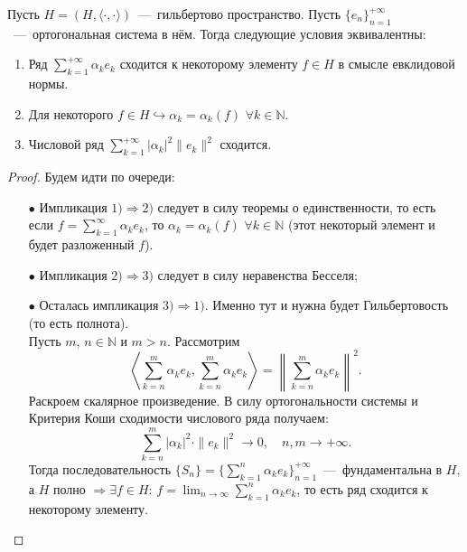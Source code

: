 \begin{theorem}
    Пусть $H = (H, \langle \cdot, \cdot \rangle)$~---~гильбертово пространство.
    Пусть $\{e_n\}_{n = 1}^{+\infty}$~---~ортогональная система в нём.
    Тогда следующие условия эквивалентны:
    \begin{enumerate}
        \item Ряд $\sum\limits_{k = 1}^{+\infty} \alpha_k e_k$ сходится к некоторому элементу $f \in H$ в смысле евклидовой нормы.
        \item Для некоторого $f \in H \hookrightarrow \alpha_k = \alpha_k(f)$ $\forall k \in \mathbb{N}$.
        \item Числовой ряд $\sum\limits_{k = 1}^{+\infty} |\alpha_k|^2\|e_k\|^2$ сходится.
    \end{enumerate}
\end{theorem}
\begin{proof}
    Будем идти по очереди:
    \begin{enumerate}
        \item[$\bullet$] Импликация $1) \Rightarrow 2)$ следует в силу теоремы о единственности, то есть если $\displaystyle f = \sum_{k=1}^{\infty}\alpha_k e_k$, то $\alpha_k = \alpha_k(f)$ $\forall k \in \mathbb{N}$ (этот некоторый элемент и будет разложенный $f$).
        \item[$\bullet$] Импликация $2) \Rightarrow 3)$ следует в силу неравенства Бесселя;
        \item[$\bullet$] Осталась импликация $3) \Rightarrow 1)$. Именно тут и нужна будет Гильбертовость (то есть полнота).\\
    Пусть $m$, $n \in \mathbb{N}$ и $m > n$.
    Рассмотрим
    \begin{equation*}
        \left\langle \sum\limits_{k = n}^{m} \alpha_k e_k, \sum\limits_{k = n}^m \alpha_k e_k \right\rangle = \left\|\sum\limits_{k = n}^m \alpha_k e_k\right\|^2.
    \end{equation*}
    Раскроем скалярное произведение. В силу ортогональности системы и Критерия Коши сходимости числового ряда получаем: $$\displaystyle \sum\limits_{k = n}^m |\alpha_k|^2 \cdot\|e_k\|^2 \rightarrow 0,\quad  n, m \rightarrow +\infty.$$
    Тогда последовательность $\displaystyle \{ S_n\} = \bigg\{ \sum_{k = 1}^{n} \alpha_k e_k\bigg\}_{n = 1}^{+\infty}$~---~фундаментальна в $H$, а $H$ полно $\Longrightarrow \exists f \in H$: $\displaystyle f = \lim_{n \to \infty} \sum_{k = 1}^{n} \alpha_k e_k$, то есть ряд сходится к некоторому элементу.
    \end{enumerate}
\end{proof}

